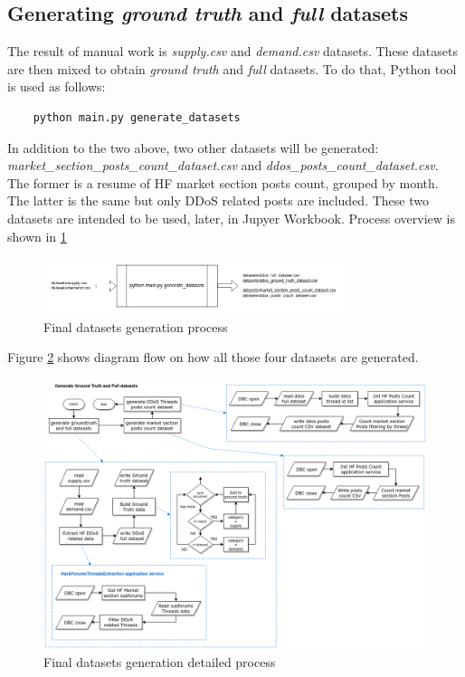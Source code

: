 \newpage

\subsection{Generating \textit{ground truth} and \textit{full} datasets}
\label{sec:builddatasets}

The result of manual work is \textit{supply.csv} and \textit{demand.csv} datasets. These datasets are then mixed to obtain \textit{ground truth} and \textit{full} datasets. To do that, Python tool is used as follows:
\begin{verbatim}
    python main.py generate_datasets
\end{verbatim}
In addition to the two above, two other datasets will be generated: \textit{market\_section\_posts\_count\_dataset.csv} and \textit{ddos\_posts\_count\_dataset.csv}. The former is a resume of HF market section posts count, grouped by month. The latter is the same but only DDoS related posts are included. These two datasets are intended to be used, later, in Jupyer Workbook. Process overview is shown in \ref{fig:generationprocess}

\begin{figure}[H]
	\centering
	\includegraphics[width=0.8\textwidth]{figs/main.py.step2.png}
	\caption{Final datasets generation process}
	\label{fig:generationprocess}
\end{figure}

Figure \ref{fig:datasets_building} shows diagram flow on how all those four datasets are generated.

\begin{figure}[H]
	\centering
	\includegraphics[width=1.0\textwidth]{figs/main.py_4_datasets.png}
	\caption{Final datasets generation detailed process}
	\label{fig:datasets_building}
\end{figure}

